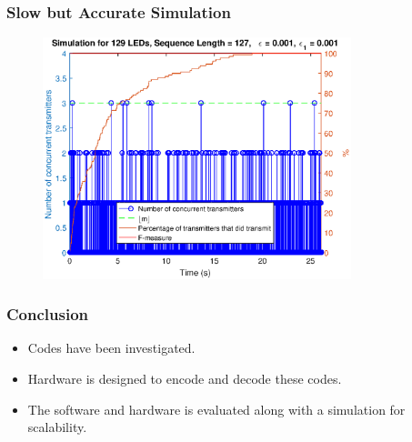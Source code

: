 \documentclass{beamer}
\begin{document}
	\begin{frame}\frametitle{Slow but Accurate Simulation}
		
		\begin{figure}
			\centering
			\includegraphics[width=0.8\textwidth]{simulation-2.eps}
		\end{figure}

	\end{frame}







	\begin{frame}\frametitle{Conclusion}

		\begin{itemize}

			\item Codes have been investigated.

			\item Hardware is designed to encode and decode these codes.

			\item The software and hardware is evaluated along with a simulation for scalability.

		\end{itemize}
		
		

	\end{frame}
\end{document}
